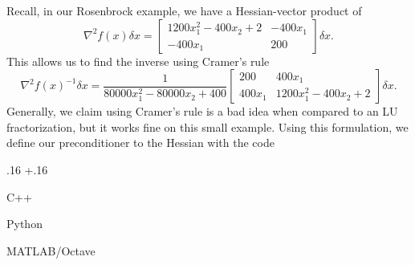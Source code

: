\documentclass{report}
\newenvironment{boldlist}
    {\begin{list}{}{
        \labelwidth.16\textwidth
        \leftmargin\dimexpr\leftmargin+.16\textwidth
        \renewcommand\makelabel[1]{%
            \textbf{##1}}}}
    {\vspace{-\dimexpr\baselineskip+2\itemsep}\end{list}}
\newcommand{\exampleitem}[2]{
    \item[Language] #1
    \item[Code] #2
    \item[]}
\begin{document}
        Recall, in our Rosenbrock example, we have a Hessian-vector product of
$$
        \nabla^2 f(x)\delta x=
        \begin{bmatrix}
            1200x_1^2-400x_2+2 & -400x_1\\
            -400x_1 & 200
        \end{bmatrix}\delta x.
$$
This allows us to find the inverse using Cramer's rule
$$
        \nabla^2 f(x)^{-1}\delta x=
        \frac{1}{80000x_1^2-80000x_2+400}
        \begin{bmatrix}
            200 & 400x_1\\
            400x_1 & 1200x_1^2-400x_2+2
        \end{bmatrix}\delta x.
$$
Generally, we claim using Cramer's rule is a bad idea when compared to an LU fractorization, but it works fine on this small example.  Using this formulation, we define our preconditioner to the Hessian with the code 
\begin{boldlist}
    \exampleitem
        {C++}
        {}

    \exampleitem
        {Python}
        {}

    \exampleitem
        {MATLAB/Octave}
        {}
\end{boldlist}
\end{document}

